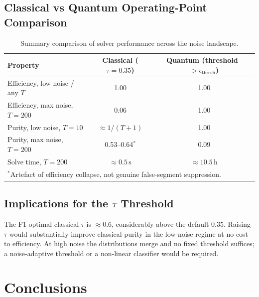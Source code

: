 \documentclass[11pt,a4paper]{article}
\newcommand{\ntrk}{T}
\newcommand{\Qthresh}{\epsilon_{\mathrm{thresh}}}
\begin{document}
\subsection{Classical vs Quantum Operating-Point Comparison}

\begin{table}[H]
  \centering
  \caption{Summary comparison of solver performance across the noise landscape.}
  \label{tab:comparison}
  \begin{tabular}{lcc}
    \toprule
    Property & Classical ($\tau=0.35$) & Quantum (threshold~$>\Qthresh$) \\
    \midrule
    Efficiency, low noise / any $\ntrk$ & 1.00 & 1.00 \\
    Efficiency, max noise, $\ntrk=200$ & 0.06 & 1.00 \\
    Purity, low noise, $\ntrk=10$ & $\approx\!1/(\ntrk{+}1)$ & 1.00 \\
    Purity, max noise, $\ntrk=200$ & 0.53--0.64$^*$ & 0.09 \\
    Solve time, $\ntrk=200$ & $\approx\!0.5\,\mathrm{s}$ & $\approx\!10.5\,\mathrm{h}$ \\
    \bottomrule
    \multicolumn{3}{l}{\small $^*$Artefact of efficiency collapse, not genuine
    false-segment suppression.}
  \end{tabular}
\end{table}

\subsection{Implications for the $\tau$ Threshold}

The F1-optimal classical $\tau$ is $\approx\!0.6$, considerably above the default
$0.35$.  Raising $\tau$ would substantially improve classical purity in the low-noise
regime at no cost to efficiency.  At high noise the distributions merge and no fixed
threshold suffices; a noise-adaptive threshold or a non-linear classifier would be
required.

\section{Conclusions}
\label{sec:conclusions}
\end{document}
